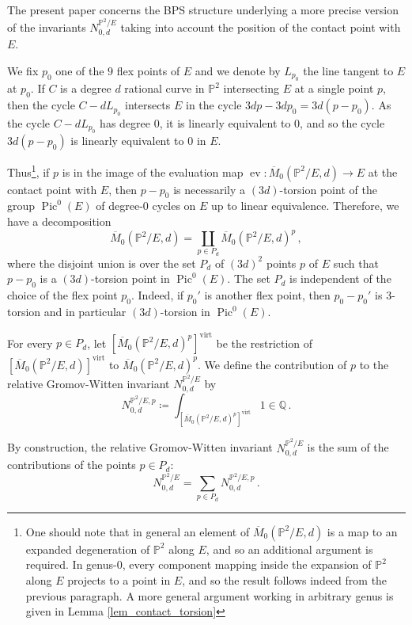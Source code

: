 \documentclass[11pt,letterpaper]{amsart}
\newcommand\PP{\mathbb P}
\newcommand\Q{\mathbb Q}
\newcommand\Pic{\operatorname{Pic}}
\newcommand\ev{\operatorname{ev}}
\newcommand\virt{\mathrm{virt}}
\begin{document}
The present paper concerns the BPS structure underlying a
more precise version of the invariants $N_{0,d}^{\PP^2/E}$ taking into account the position of the contact point with $E$.

We fix $p_0$
one of the $9$ flex points of $E$ and we denote by $L_{p_0}$ the line tangent to $E$ at $p_0$. If $C$ is a degree $d$ 
rational curve in 
$\PP^2$ intersecting $E$ at a single point $p$, then the cycle
$C-dL_{p_0}$ intersects $E$ in the cycle $3d p-3dp_0=3d(p-p_0)$.
As the cycle $C-dL_{p_0}$ has degree $0$, it is linearly equivalent to $0$, and so the cycle $3d (p-p_0)$ is linearly equivalent to $0$ in $E$.

Thus\footnote{One should note that in general an element of $\overline{M}_0(\PP^2/E,d)$ is a map to an expanded degeneration of $\PP^2$ along $E$, and so an additional argument is required. In genus-$0$, every component mapping inside the expansion of $\PP^2$ along $E$ projects to a point in $E$, and so the result follows indeed from the previous paragraph. A more general argument working in arbitrary genus is given in Lemma 
\ref{lem_contact_torsion}}, if $p$ is in the image of the evaluation map $\ev \colon \overline{M}_0(\PP^2/E,d) \rightarrow E$ at the contact point with $E$, then $p-p_0$ is necessarily a $(3d)$-torsion point of
the group
$\Pic^0(E)$ of degree-$0$ cycles on $E$ up to linear equivalence. Therefore, we have a decomposition 
\[\overline{M}_0(\PP^2/E,d) = \coprod_{p \in P_d} \overline{M}_0(\PP^2/E,d)^p \,,\]
where the disjoint union is over the set $P_d$ of $(3d)^2$ points $p$ of $E$ such that $p-p_0$ is a $(3d)$-torsion point in $\Pic^0(E)$. 
The set $P_d$ is independent of the choice of the flex point $p_0$. Indeed, if $p_0'$ is another flex point, then $p_0-p_0'$ is $3$-torsion and in particular $(3d)$-torsion in $\Pic^0(E)$.

For every $p \in P_d$, let
$[\overline{M}_{0}(\PP^2/E,d)^p]^{\virt}$ be
the restriction of 
$[\overline{M}_{0}(\PP^2/E,d)]^{\virt}$
to $\overline{M}_{0}(\PP^2/E,d)^p$.
We define the contribution of $p$ to the relative Gromov-Witten invariant $N_{0,d}^{\PP^2/E}$ by
\[N_{0,d}^{\PP^2/E,p} \coloneq \int_{[\overline{M}_{0}(\PP^2/E,d)^p]^{\virt}} 1 \in \Q \,.\]

By construction, the relative Gromov-Witten invariant 
$N_{0,d}^{\PP^2/E}$ is the sum of the contributions of the points $p \in P_d$:
\begin{equation}\label{eq_total_gw}
N_{0,d}^{\PP^2/E} = \sum_{p \in P_d} N_{0,d}^{\PP^2/E,p} \,.\end{equation}
\end{document}
